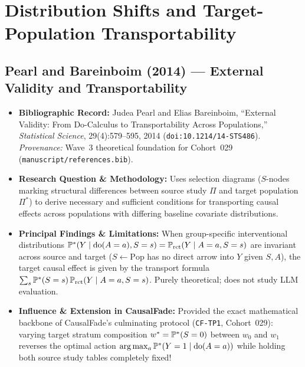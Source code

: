 \section{Distribution Shifts and Target-Population Transportability}

\subsection{Pearl and Bareinboim (2014) --- External Validity and Transportability \citep{pearl2014external}}
\begin{itemize}
  \item \textbf{Bibliographic Record:} Judea Pearl and Elias Bareinboim, ``External Validity: From Do-Calculus to Transportability Across Populations,'' \emph{Statistical Science}, 29(4):579--595, 2014 (\texttt{doi:10.1214/14-STS486}). \emph{Provenance:} Wave~3 theoretical foundation for Cohort~029 (\texttt{manuscript/references.bib}).
  \item \textbf{Research Question \& Methodology:} Uses selection diagrams ($S$-nodes marking structural differences between source study $\Pi$ and target population $\Pi^*$) to derive necessary and sufficient conditions for transporting causal effects across populations with differing baseline covariate distributions.
  \item \textbf{Principal Findings \& Limitations:} When group-specific interventional distributions $\mathbb{P}^*(Y\mid \operatorname{do}(A=a), S=s) = \mathbb{P}_{\mathrm{rct}}(Y\mid A=a, S=s)$ are invariant across source and target ($S \leftarrow \text{Pop}$ has no direct arrow into $Y$ given $S, A$), the target causal effect is given by the transport formula $\sum_s \mathbb{P}^*(S=s)\,\mathbb{P}_{\mathrm{rct}}(Y\mid A=a, S=s)$. Purely theoretical; does not study LLM evaluation.
  \item \textbf{Influence \& Extension in CausalFade:} Provided the exact mathematical backbone of CausalFade's culminating protocol (\texttt{CF-TP1}, Cohort~029): varying target stratum composition $w^* = \mathbb{P}^*(S=0)$ between $w_0$ and $w_1$ reverses the optimal action $\arg\max_a \mathbb{P}^*(Y=1\mid \operatorname{do}(A=a))$ while holding both source study tables completely fixed!
\end{itemize}

